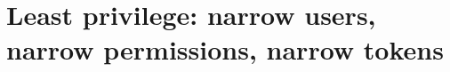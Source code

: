 \chapter{Least privilege: narrow users, narrow permissions, narrow tokens}
\label{ch:least-privilege-narrow-users-narrow}

